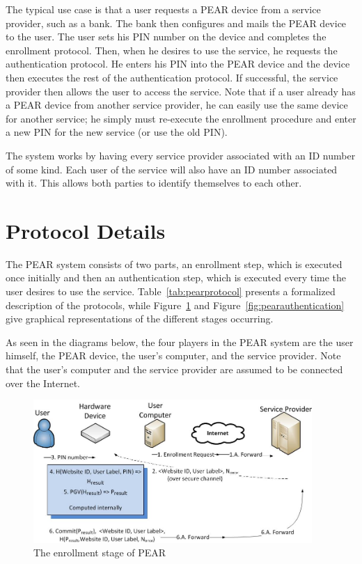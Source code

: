 The typical use case is that a user requests a PEAR device from a service provider, such as a bank. The bank then configures
and mails the PEAR device to the user. The user sets his PIN number on the device and completes the enrollment protocol.
Then, when he desires to use the service, he requests the authentication protocol. He enters his PIN into the PEAR device
and the device then executes the rest of the authentication protocol. If successful, the service provider then allows
the user to access the service. 
Note that if a user already has a PEAR device from another service provider, he can easily use the same device for another
service; he simply must re-execute the enrollment procedure and enter a new PIN for the new service (or use the old PIN).

The system works by having every service provider associated with an ID number of some kind. Each user of the service will
also have an ID number associated with it. This allows both parties to identify themselves to each other.

\section{Protocol Details}
The PEAR system consists of two parts, an enrollment step, which is executed once initially and then an authentication step,
which is executed every time the user desires to use the service.
Table~\ref{tab:pearprotocol} presents a formalized description of the protocols, while Figure~\ref{fig:pearenrollment}
and Figure~\ref{fig:pearauthentication} give graphical representations of the different stages occurring.

As seen in the diagrams below, the four players in the PEAR system are the user himself, the PEAR device, the user's computer,
and the service provider. Note that the user's computer and the service provider are assumed to be connected over the Internet.

\begin{figure}[!ht]
\centering
\includegraphics[width=400px]{images/enrollment.jpg}
\caption{The enrollment stage of PEAR}
\label{fig:pearenrollment}
\vspace{-25pt}
\end{figure}
\FloatBarrier

